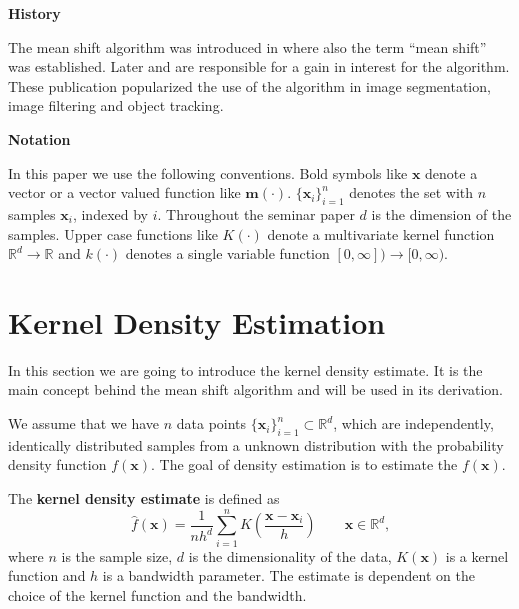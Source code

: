 \documentclass{article}
\begin{document}
\textbf{History}

The mean shift algorithm was introduced in \cite{Fukunaga.1975} where also the term ``mean shift'' was established. Later \cite{Comaniciu.2002} and \cite{Comaniciu.2003} are responsible for a gain in interest for the algorithm. These publication popularized the use of the algorithm in image segmentation, image filtering and  object tracking.


\textbf{Notation}

In this paper we use the following conventions. Bold symbols like $\bm{x}$ denote a vector or a vector valued function like $\bm{m}(\cdot)$. $\{ \bm{x}_i \}_{i=1}^n$ denotes the set with $n$ samples $\bm{x}_i$, indexed by $i$. Throughout the seminar paper $d$ is the dimension of the samples. Upper case functions like $K(\cdot)$ denote a multivariate kernel function $\mathbb{R}^d \rightarrow \mathbb{R}$ and $k(\cdot)$ denotes a single variable function $[0, \infty]) \rightarrow [0, \infty)$.


\section{Kernel Density Estimation} \label{sec:kernel-density-estimation}

In this section we are going to introduce the kernel density estimate. It is the main concept behind the mean shift algorithm and will be used in its derivation.

We assume that we have $n$ data points $\{\bm{x}_i\}_{i=1}^n \subset \mathbb{R}^d$, which are independently, identically distributed samples from a unknown distribution with the probability density function $f(\bm{x})$. The goal of density estimation is to estimate the $f(\bm{x})$.


The \textbf{kernel density estimate} is defined as
\begin{equation}
	\hat{f}(\bm{x}) = \frac{1}{nh^d} \sum_{i=1}^n K\left(\frac{\bm{x} - \bm{x}_i}{h} \right) \qquad \bm{x} \in \mathbb{R}^d\text{,}
	\label{eq:kernel-density-estimate}
\end{equation}
where $n$ is the sample size, $d$ is the dimensionality of the data, $K(\bm{x})$ is a kernel function and $h$ is a bandwidth parameter. The estimate is dependent on the choice of the kernel function and the bandwidth.
\end{document}
